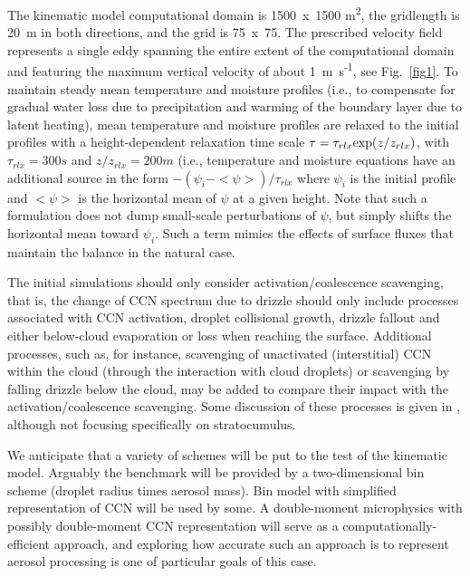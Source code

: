 \documentclass{article}
\begin{document}
  The kinematic model computational domain is 1500~x~1500 m\textsuperscript{2}, the gridlength 
    is 20~m in both directions, and the grid is 75~x~75. 
  The prescribed velocity field represents a single eddy spanning the entire extent of the 
    computational domain and featuring the maximum vertical velocity of about 1~m~s\textsuperscript{-1}, 
    see Fig.~\ref{fig1}. 
  To maintain steady mean temperature and moisture profiles (i.e., to compensate for gradual water loss 
    due to precipitation and warming of the boundary layer due to latent heating), 
    mean temperature and moisture profiles are relaxed to the initial profiles with a height-dependent 
    relaxation time scale $\tau = \tau_{rlx}{\rm exp}(z/z_{rlx})$, with $\tau_{rlx} = 300 s$ and $z/z_{rlx} = 200 m$
    (i.e., temperature and moisture equations have an additional source in the form $−(\psi_i −<\psi>)/\tau_{rlx}$
    where $\psi_i$ is the initial profile and $<\psi>$ is the horizontal mean of $\psi$ at a given height. 
  Note that such a formulation does not dump small-scale perturbations of $\psi$, but simply shifts the 
    horizontal mean toward $\psi_i$. 
  Such a term mimics the effects of surface fluxes that maintain the balance in the natural case.

  The initial simulations should only consider activation/coalescence scavenging, 
    that is, the change of CCN spectrum due to drizzle should only include processes 
    associated with CCN activation, droplet collisional growth, drizzle fallout and either 
    below-cloud evaporation or loss when reaching the surface. 
  Additional processes, such as, for instance, scavenging of unactivated (interstitial) 
    CCN within the cloud (through the interaction with cloud droplets) or scavenging by 
    falling drizzle below the cloud, may be added to compare their impact with the 
    activation/coalescence scavenging. 
  Some discussion of these processes is given in \citet{Flossmann_and_Wobrock_2010}, 
    although not focusing specifically on stratocumulus.

  We anticipate that a variety of schemes will be put to the test of the kinematic model. 
  Arguably the benchmark will be provided by a two-dimensional bin scheme 
    (droplet radius times aerosol mass). 
  Bin model with simplified representation of CCN will be used by some. 
  A double-moment microphysics with possibly double-moment CCN representation will serve as a 
    computationally-efficient approach, and exploring how accurate such an approach is to represent 
    aerosol processing is one of particular goals of this case.
\end{document}

